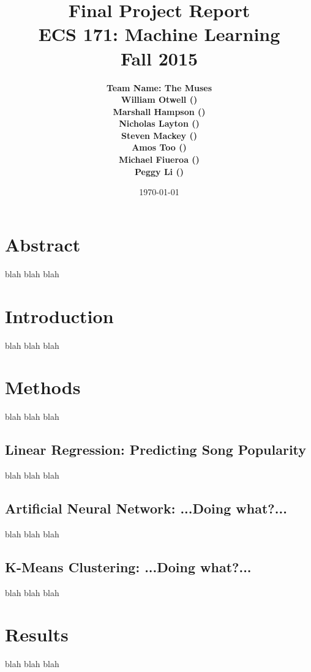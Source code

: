 \documentclass[11pt]{article}
\title{\vspace{-3ex}\bf Final Project Report\\[2ex] 
       \normalsize ECS 171: Machine Learning\\Fall 2015}
\date{\today}
\author{\bf Team Name: The Muses\\ \bf William Otwell ()\\ \bf Marshall Hampson ()\\ \bf Nicholas Layton ()\\ \bf Steven Mackey ()\\ \bf Amos Too ()\\ \bf Michael Fiueroa ()\\ \bf Peggy Li ()}
\begin{document}
\maketitle
\pagebreak
\tableofcontents
\pagebreak

\section{Abstract}
\label{sec:abstract}
blah blah blah

\section{Introduction}
\label{sec:introduction}
blah blah blah

\section{Methods}
\label{sec:methods}
blah blah blah

\subsection{Linear Regression: Predicting Song Popularity}
\label{subsec:linearRegression}
blah blah blah

\subsection{Artificial Neural Network: ...Doing what?...}
\label{subsec:ann}
blah blah blah

\subsection{K-Means Clustering: ...Doing what?...}
\label{subsec:kMeans}
blah blah blah

\section{Results}
\label{sec:results}
blah blah blah
\end{document}
